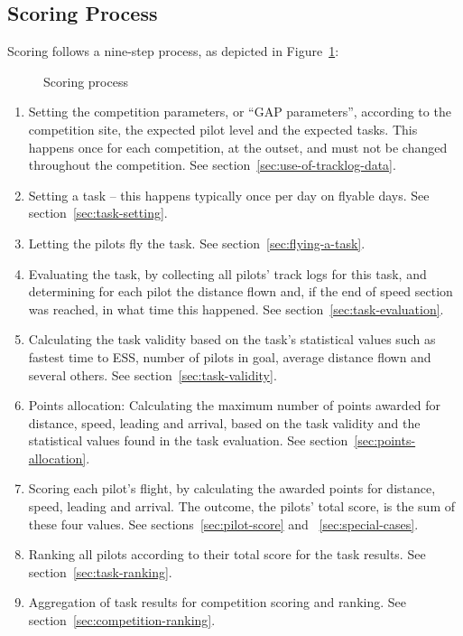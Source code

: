 \documentclass{article}
\begin{document}
\subsection{Scoring Process}
Scoring follows a nine-step process, as depicted in
Figure~\ref{fig:scoring-process}:

\begin{figure}[h!]
    \centering
    
    \caption{Scoring process}
    \label{fig:scoring-process}
\end{figure}

\begin{enumerate}
    \item
        Setting the competition parameters, or “GAP parameters”, according to
        the competition site, the expected pilot level and the expected tasks.
        This happens once for each competition, at the outset, and must not be
        changed throughout the competition. See
        section~\ref{sec:use-of-tracklog-data}.
    \item
        Setting a task – this happens typically once per day on flyable days.
        See section~\ref{sec:task-setting}.
    \item
        Letting the pilots fly the task. See section~\ref{sec:flying-a-task}.
    \item
        Evaluating the task, by collecting all pilots’ track logs for this
        task, and determining for each pilot the distance flown and, if the end
        of speed section was reached, in what time this happened. See
        section~\ref{sec:task-evaluation}.
    \item
        Calculating the task validity based on the task’s statistical values
        such as fastest time to ESS, number of pilots in goal, average distance
        flown and several others. See section~\ref{sec:task-validity}.
    \item
        Points allocation: Calculating the maximum number of points awarded for
        distance, speed, leading and arrival, based on the task validity and
        the statistical values found in the task evaluation. See
        section~\ref{sec:points-allocation}.
    \item
        Scoring each pilot’s flight, by calculating the awarded points for
        distance, speed, leading and arrival. The outcome, the pilots’ total
        score, is the sum of these four values. See
        sections~\ref{sec:pilot-score} and ~\ref{sec:special-cases}.
    \item
        Ranking all pilots according to their total score for the task results.
        See section~\ref{sec:task-ranking}.
    \item
        Aggregation of task results for competition scoring and ranking. See
        section~\ref{sec:competition-ranking}.
\end{enumerate}
\end{document}
